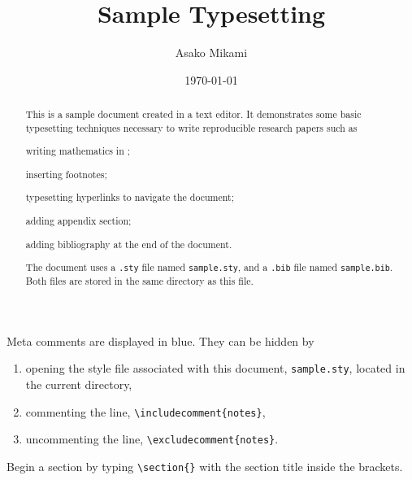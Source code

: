 \documentclass[12pt, notitlepage]{article}
\begin{document}
\title{Sample \latex Typesetting}
\author{Asako Mikami}
\date{\today}
\maketitle

\begin{abstract}
This is a sample document created in a \latex text editor. It demonstrates some basic \latex typesetting techniques necessary to write reproducible research papers such as 
\begin{enumerate*}[label =\alph*)]
\item writing mathematics in \latex; 
\item inserting footnotes; 
\item typesetting hyperlinks to navigate the document; 
\item adding appendix section; 
\item adding bibliography at the end of the document. 
\end{enumerate*}
The document uses a \texttt{.sty} file named \texttt{sample.sty}, and a \texttt{.bib} file named \texttt{sample.bib}. Both files are stored in the same directory as this file. 
\end{abstract}


\begin{notes}
Meta comments are displayed in blue. They can be hidden by 
\begin{enumerate}
\item opening the style file associated with this document, \texttt{sample.sty}, located in the current directory,
\item commenting the line, \verb|\includecomment{notes}|, 
\item uncommenting the line, \verb|\excludecomment{notes}|.
\end{enumerate}
\end{notes}


\begin{notes}
Begin a section by typing \verb|\section{}| with the section title inside the brackets.
\end{notes}
\end{document}
